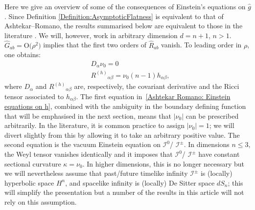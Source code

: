 \documentclass[a4paper, 10pt]{article}
\theoremstyle{remark}
\newcommand{\pg}{\hat{g}}
\newcommand{\bigO}[1]{\textrm{O(}#1\textrm{)}}
\begin{document}
Here we give an overview of some of the consequences of Einstein's equations on $\pg$.
Since Definition \ref{Definition:AsymptoticFlatness} is equivalent to that of Ashtekar--Romano, the results summarised below are equivalent to those in the literature \cite{Compere:2011ve,Compere:2023qoa}. We will, however, work in arbitrary dimension $d = n+1$, $n > 1$. 
$\hat{G}_{a b} = \bigO{\rho^2}$ implies that the first two orders of $\hat{R}_{ab}$ vanish. To leading order in $\rho$, one obtains:
%
\begin{equation}
\begin{aligned}\label{Ashtekar Romano: Einstein equations on h}
    &D_\alpha \nu_0 = 0 \\
    &R^{(h)}{}_{\alpha \beta} = \nu_0 (n-1) h_{\alpha \beta},
\end{aligned}\end{equation}
%
where $D_\alpha$ and $R^{(h)}{}_{\alpha \beta}$ are, respectively, the covariant derivative and the Ricci tensor associated to $h_{\alpha \beta}$. The first equation in~\eqref{Ashtekar Romano: Einstein equations on h}, combined with the ambiguity in the boundary defining function that will be emphasised in the next section, means that $|\nu_0|$ can be prescribed arbitrarily. In the literature, it is common practice to assign $|\nu_0|=1$; we will divert slightly from this by  allowing it to take an arbitrary positive value. 
The second equation is the vacuum Einstein equation on $\mathcal{I}^{0}$/ $\mathcal{I}^{\pm}$. In dimensions $n \leq 3$, the Weyl tensor vanishes identically and it imposes that $\mathcal{I}^{0}$/ $\mathcal{I}^{\pm}$ have constant sectional curvature $\kappa = \nu_0$. In higher dimensions, this is no longer necessary but we will nevertheless assume that past/future timelike infinity $\mathcal{I}^{\pm}$ is (locally) hyperbolic space $H^n$, and spacelike infinity is (locally) De Sitter space $dS_n$; this will simplify the presentation but a number of the results in this article will not rely on this assumption. 
\end{document}
